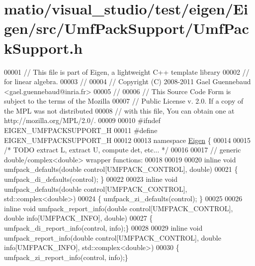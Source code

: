 \hypertarget{matio_2visual__studio_2test_2eigen_2_eigen_2src_2_umf_pack_support_2_umf_pack_support_8h_source}{}\section{matio/visual\+\_\+studio/test/eigen/\+Eigen/src/\+Umf\+Pack\+Support/\+Umf\+Pack\+Support.h}
\label{matio_2visual__studio_2test_2eigen_2_eigen_2src_2_umf_pack_support_2_umf_pack_support_8h_source}

\begin{DoxyCode}
00001 \textcolor{comment}{// This file is part of Eigen, a lightweight C++ template library}
00002 \textcolor{comment}{// for linear algebra.}
00003 \textcolor{comment}{//}
00004 \textcolor{comment}{// Copyright (C) 2008-2011 Gael Guennebaud <gael.guennebaud@inria.fr>}
00005 \textcolor{comment}{//}
00006 \textcolor{comment}{// This Source Code Form is subject to the terms of the Mozilla}
00007 \textcolor{comment}{// Public License v. 2.0. If a copy of the MPL was not distributed}
00008 \textcolor{comment}{// with this file, You can obtain one at http://mozilla.org/MPL/2.0/.}
00009 
00010 \textcolor{preprocessor}{#ifndef EIGEN\_UMFPACKSUPPORT\_H}
00011 \textcolor{preprocessor}{#define EIGEN\_UMFPACKSUPPORT\_H}
00012 
00013 \textcolor{keyword}{namespace }\hyperlink{namespace_eigen}{Eigen} \{
00014 
00015 \textcolor{comment}{/* TODO extract L, extract U, compute det, etc... */}
00016 
00017 \textcolor{comment}{// generic double/complex<double> wrapper functions:}
00018 
00019 
00020 \textcolor{keyword}{inline} \textcolor{keywordtype}{void} umfpack\_defaults(\textcolor{keywordtype}{double} control[UMFPACK\_CONTROL], \textcolor{keywordtype}{double})
00021 \{ umfpack\_di\_defaults(control); \}
00022 
00023 \textcolor{keyword}{inline} \textcolor{keywordtype}{void} umfpack\_defaults(\textcolor{keywordtype}{double} control[UMFPACK\_CONTROL], std::complex<double>)
00024 \{ umfpack\_zi\_defaults(control); \}
00025 
00026 \textcolor{keyword}{inline} \textcolor{keywordtype}{void} umfpack\_report\_info(\textcolor{keywordtype}{double} control[UMFPACK\_CONTROL], \textcolor{keywordtype}{double} info[UMFPACK\_INFO], \textcolor{keywordtype}{double})
00027 \{ umfpack\_di\_report\_info(control, info);\}
00028 
00029 \textcolor{keyword}{inline} \textcolor{keywordtype}{void} umfpack\_report\_info(\textcolor{keywordtype}{double} control[UMFPACK\_CONTROL], \textcolor{keywordtype}{double} info[UMFPACK\_INFO], 
      std::complex<double>)
00030 \{ umfpack\_zi\_report\_info(control, info);\}

\end{DoxyCode}
